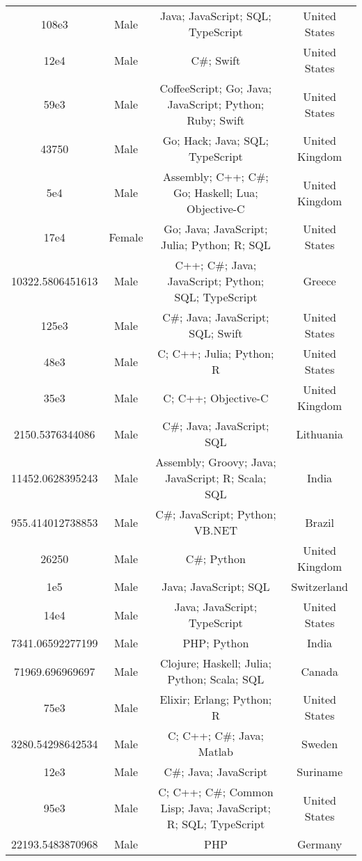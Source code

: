 \begin{center}
\begin{tabular}{ |c|c|c|c| }
108e3  &  Male  &  Java; JavaScript; SQL; TypeScript  &  United States  \\ 
12e4  &  Male  &  C\#; Swift  &  United States  \\ 
59e3  &  Male  &  CoffeeScript; Go; Java; JavaScript; Python; Ruby; Swift  &  United States  \\ 
43750  &  Male  &  Go; Hack; Java; SQL; TypeScript  &  United Kingdom  \\ 
5e4  &  Male  &  Assembly; C++; C\#; Go; Haskell; Lua; Objective-C  &  United Kingdom  \\ 
17e4  &  Female  &  Go; Java; JavaScript; Julia; Python; R; SQL  &  United States  \\ 
10322.5806451613  &  Male  &  C++; C\#; Java; JavaScript; Python; SQL; TypeScript  &  Greece  \\ 
125e3  &  Male  &  C\#; Java; JavaScript; SQL; Swift  &  United States  \\ 
48e3  &  Male  &  C; C++; Julia; Python; R  &  United States  \\ 
35e3  &  Male  &  C; C++; Objective-C  &  United Kingdom  \\ 
2150.5376344086  &  Male  &  C\#; Java; JavaScript; SQL  &  Lithuania  \\ 
11452.0628395243  &  Male  &  Assembly; Groovy; Java; JavaScript; R; Scala; SQL  &  India  \\ 
955.414012738853  &  Male  &  C\#; JavaScript; Python; VB.NET  &  Brazil  \\ 
26250  &  Male  &  C\#; Python  &  United Kingdom  \\ 
1e5  &  Male  &  Java; JavaScript; SQL  &  Switzerland  \\ 
14e4  &  Male  &  Java; JavaScript; TypeScript  &  United States  \\ 
7341.06592277199  &  Male  &  PHP; Python  &  India  \\ 
71969.696969697  &  Male  &  Clojure; Haskell; Julia; Python; Scala; SQL  &  Canada  \\ 
75e3  &  Male  &  Elixir; Erlang; Python; R  &  United States  \\ 
3280.54298642534  &  Male  &  C; C++; C\#; Java; Matlab  &  Sweden  \\ 
12e3  &  Male  &  C\#; Java; JavaScript  &  Suriname  \\ 
95e3  &  Male  &  C; C++; C\#; Common Lisp; Java; JavaScript; R; SQL; TypeScript  &  United States  \\ 
22193.5483870968  &  Male  &  PHP  &  Germany  \\ 

\end{tabular}
\end{center}
